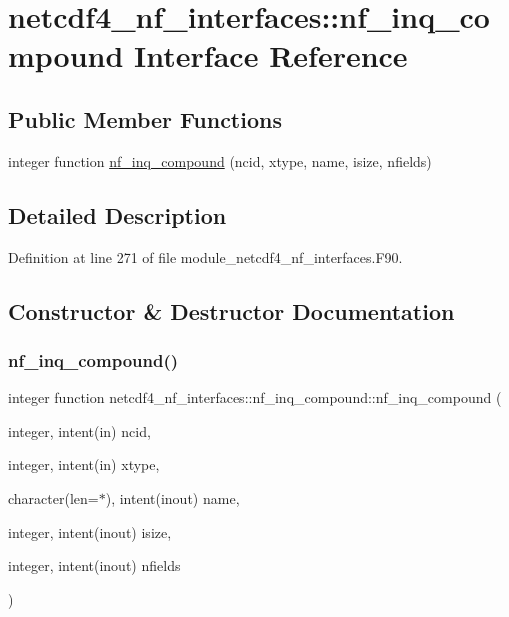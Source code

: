 \hypertarget{interfacenetcdf4__nf__interfaces_1_1nf__inq__compound}{}\section{netcdf4\+\_\+nf\+\_\+interfaces\+:\+:nf\+\_\+inq\+\_\+compound Interface Reference}
\label{interfacenetcdf4__nf__interfaces_1_1nf__inq__compound}
\subsection*{Public Member Functions}
\begin{DoxyCompactItemize}
\item 
integer function \hyperlink{interfacenetcdf4__nf__interfaces_1_1nf__inq__compound_a394665f5d8493acb0130367a2e4c6375}{nf\+\_\+inq\+\_\+compound} (ncid, xtype, name, isize, nfields)
\end{DoxyCompactItemize}


\subsection{Detailed Description}


Definition at line 271 of file module\+\_\+netcdf4\+\_\+nf\+\_\+interfaces.\+F90.



\subsection{Constructor \& Destructor Documentation}
\mbox{\label{interfacenetcdf4__nf__interfaces_1_1nf__inq__compound_a394665f5d8493acb0130367a2e4c6375}} 
\subsubsection{\texorpdfstring{nf\+\_\+inq\+\_\+compound()}{nf\_inq\_compound()}}
{\footnotesize\ttfamily integer function netcdf4\+\_\+nf\+\_\+interfaces\+::nf\+\_\+inq\+\_\+compound\+::nf\+\_\+inq\+\_\+compound (\begin{DoxyParamCaption}\item[{integer, intent(in)}]{ncid,  }\item[{integer, intent(in)}]{xtype,  }\item[{character(len=$\ast$), intent(inout)}]{name,  }\item[{integer, intent(inout)}]{isize,  }\item[{integer, intent(inout)}]{nfields }\end{DoxyParamCaption})}



